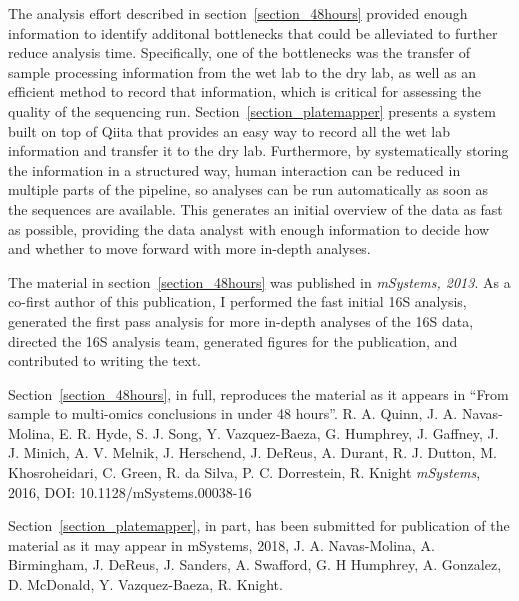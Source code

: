 \documentclass[12pt,chapterheads]{ucsd}
\begin{document}
The analysis effort described in section~\ref{section_48hours} provided enough
information to identify additonal bottlenecks that could be alleviated to further
reduce analysis time. Specifically, one of the bottlenecks was the transfer of sample
processing information from the wet lab to the dry lab, as well as an efficient
method to record that information, which is critical for assessing the quality of the sequencing run.
Section~\ref{section_platemapper} presents a system built on top of Qiita that
provides an easy way to record all the wet lab information and transfer
it to the dry lab. Furthermore, by systematically storing the information in a
structured way, human interaction can be reduced in multiple parts of the pipeline,
so analyses can be run automatically as soon as the sequences are available.
This generates an initial overview of the data as fast as possible, providing
the data analyst with enough information to decide how and whether to move forward with
more in-depth analyses.

The material in section~\ref{section_48hours} was published in \textsl{mSystems, 2013}.
As a co-first author of this publication, I performed the fast initial 16S analysis,
generated the first pass analysis for more in-depth analyses of the 16S data,
directed the 16S analysis team, generated figures for the publication, and
contributed to writing the text.

Section~\ref{section_48hours}, in full, reproduces the material as it
appears in ``From sample to multi-omics conclusions in under 48 hours''.
R. A. Quinn, J. A. Navas-Molina, E. R. Hyde, S. J. Song, Y. Vazquez-Baeza,
G. Humphrey, J. Gaffney, J. J. Minich, A. V. Melnik, J. Herschend, J. DeReus,
A. Durant, R. J. Dutton, M. Khosroheidari, C. Green, R. da Silva, P. C. Dorrestein,
R. Knight \emph{mSystems}, 2016, DOI: 10.1128/mSystems.00038-16

Section~\ref{section_platemapper}, in part, has been submitted for publication of the
material as it may appear in mSystems, 2018, J. A. Navas-Molina, A. Birmingham,
J. DeReus, J. Sanders, A. Swafford, G. H Humphrey, A. Gonzalez, D. McDonald,
Y. Vazquez-Baeza, R. Knight.






\appendix


\printindex %


\end{document}
